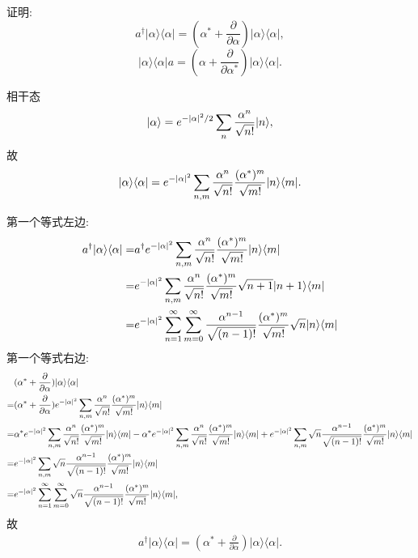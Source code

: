 \documentclass{assignment}
\begin{document}
\begin{prob}
    证明:
    \[
        a^{\dagger}\lvert\alpha\rangle\langle\alpha\rvert=(\alpha^*+\frac{\partial}{\partial\alpha})\lvert\alpha\rangle\langle\alpha\rvert,
    \]
    \[
        \lvert\alpha\rangle\langle\alpha\rvert a=(\alpha+\frac{\partial}{\partial\alpha^*})\lvert\alpha\rangle\langle\alpha\rvert.
    \]
\end{prob}
\begin{pf}
    相干态
    \begin{align}
        \lvert\alpha\rangle=e^{-\left\lvert\alpha\right\rvert^2/2}\sum_n\frac{\alpha^n}{\sqrt{n!}}\lvert n\rangle,
    \end{align}
    故
    \begin{align}
        \lvert\alpha\rangle\langle\alpha\rvert=e^{-\left\lvert\alpha\right\rvert^2}\sum_{n,m}\frac{\alpha^n}{\sqrt{n!}}\frac{(\alpha^*)^m}{\sqrt{m!}}\lvert n\rangle\langle m\rvert.
    \end{align}

    第一个等式左边:
    \begin{align}
        \notag a^{\dagger}\lvert\alpha\rangle\langle\alpha\rvert=&a^{\dagger}e^{-\left\lvert\alpha\right\rvert^2}\sum_{n,m}\frac{\alpha^n}{\sqrt{n!}}\frac{(\alpha^*)^m}{\sqrt{m!}}\lvert n\rangle\langle m\rvert\\
        \notag=&e^{-\left\lvert\alpha\right\rvert^2}\sum_{n,m}\frac{\alpha^n}{\sqrt{n!}}\frac{(\alpha^*)^m}{\sqrt{m!}}\sqrt{n+1}\lvert n+1\rangle\langle m\rvert\\
        =&e^{-\left\lvert\alpha\right\rvert^2}\sum_{n=1}^{\infty}\sum_{m=0}^{\infty}\frac{\alpha^{n-1}}{\sqrt{(n-1)!}}\frac{(\alpha^*)^m}{\sqrt{m!}}\sqrt{n}\lvert n\rangle\langle m\rvert
    \end{align}
    第一个等式右边:
    \begin{align}
        \notag&(\alpha^*+\frac{\partial}{\partial\alpha})\lvert\alpha\rangle\langle\alpha\rvert\\
        =&(\alpha^*+\frac{\partial}{\partial\alpha})e^{-\left\lvert\alpha\right\rvert^2}\sum_{n,m}\frac{\alpha^n}{\sqrt{n!}}\frac{(\alpha^*)^m}{\sqrt{m!}}\lvert n\rangle\langle m\rvert\\
        \notag=&\alpha^*e^{-\left\lvert\alpha\right\rvert^2}\sum_{n,m}\frac{\alpha^n}{\sqrt{n!}}\frac{(\alpha^*)^m}{\sqrt{m!}}\lvert n\rangle\langle m\rvert-\alpha^*e^{-\left\lvert\alpha\right\rvert^2}\sum_{n,m}\frac{\alpha^n}{\sqrt{n!}}\frac{(\alpha^*)^m}{\sqrt{m!}}\lvert n\rangle\langle m\rvert+e^{-\left\lvert\alpha\right\rvert^2}\sum_{n,m}\sqrt{n}\frac{\alpha^{n-1}}{\sqrt{(n-1)!}}\frac{(a^*)^m}{\sqrt{m!}}\lvert n\rangle\langle m\rvert\\
        \notag=&e^{-\left\lvert\alpha\right\rvert^2}\sum_{n,m}\sqrt{n}\frac{\alpha^{n-1}}{\sqrt{(n-1)!}}\frac{(\alpha^*)^m}{\sqrt{m!}}\lvert n\rangle\langle m\rvert\\
        =&e^{-\left\lvert\alpha\right\rvert^2}\sum_{n=1}^{\infty}\sum_{m=0}^{\infty}\sqrt{n}\frac{\alpha^{n-1}}{\sqrt{(n-1)!}}\frac{(\alpha^*)^m}{\sqrt{m!}}\lvert n\rangle\langle m\rvert,
    \end{align}
    故
    \begin{align}
        a^{\dagger}\lvert\alpha\rangle\langle\alpha\rvert=(\alpha^*+\frac{\partial}{\partial\alpha})\lvert\alpha\rangle\langle\alpha\rvert.
    \end{align}


\end{pf}
\end{document}
